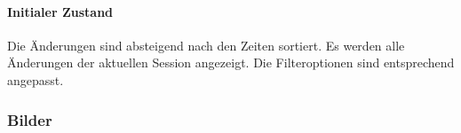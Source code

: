 \paragraph*{Initialer Zustand}
Die Änderungen sind absteigend nach den Zeiten sortiert.
Es werden alle Änderungen der aktuellen Session angezeigt.
Die Filteroptionen sind entsprechend angepasst.

\subsubsection*{Bilder}
\begin{minipage}{\linewidth}
    \centering
    \begin{minipage}{.69\textwidth}
        \captionsetup[figure]{labelformat=empty}
        \captionsetup[figure]{labelformat=default}
    \end{minipage}
    \begin{minipage}{.3\textwidth}
        \captionsetup[figure]{labelformat=empty}
        \captionsetup[figure]{labelformat=default}
    \end{minipage}
\end{minipage}